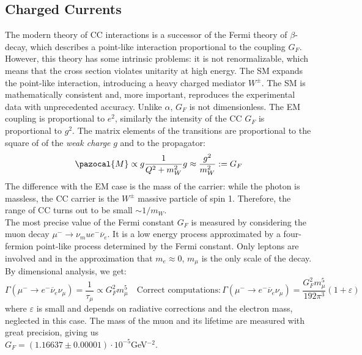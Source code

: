 \documentclass[10.75pt,a4paper,openright,bottom=2cm]{article}
\begin{document}
\subsection{Charged Currents}
The modern theory of CC interactions is a successor of the Fermi theory of $\beta$-decay, which describes a point-like interaction proportional to the coupling $G_F$. However, this theory has some intrinsic problems: it is not renormalizable, which means that the cross section violates unitarity at high energy. The SM expands the point-like interaction, introducing a heavy charged mediator $W^\pm$. The SM is mathematically consistent and, more important, reproduces the experimental data with unprecedented accuracy. Unlike $\alpha$, $G_F$ is not dimensionless. The EM coupling is proportional to $e^2$, similarly the intensity of the CC $G_F$ is proportional to $g^2$. The matrix elements of the transitions are proportional to the square of of the \textit{weak charge} $g$ and to the propagator:
\[
\pazocal{M}\propto g\frac{1}{Q^2+m_W^2}g\approx\frac{g^2}{m_W^2}:=G_F
\]
The difference with the EM case is the mass of the carrier: while the photon is massless, the CC carrier is the $W^\pm$ massive particle of spin 1. Therefore, the range of CC turns out to be small $\sim1/m_W$.\\
The most precise value of the Fermi constant $G_F$ is measured by considering the muon decay $\mu^-\to\nu_mu e^-\overline{\nu}_e$. It is a low energy process approximated by a four-fermion point-like process determined by the Fermi constant. Only leptons are involved and in the approximation that $m_e\approx0$, $m_\mu$ is the only scale of the decay. By dimensional analysis, we get:
\[
\Gamma(\mu^-\to e^-\overline{\nu}_e\nu_\mu)=\frac{1}{\tau_\mu}\propto G_F^2m_\mu^5 \quad \text{Correct computations:}\,\Gamma(\mu^-\to e^-\overline{\nu}_e\nu_\mu)=\frac{G_F^2m_\mu^5}{192\pi^3}(1+\varepsilon)
\]
where $\varepsilon$ is small and depends on radiative corrections and the electron mass, neglected in this case. The mass of the muon and its lifetime are measured with great precision, giving us\\
$G_F=(1.16637\pm0.00001)\cdot10^{-5}$\;GeV$^{-2}$.
\end{document}
